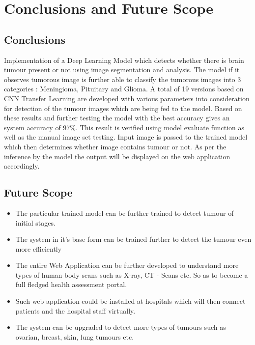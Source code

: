 \chapter{Conclusions and Future Scope}
\section{Conclusions }
Implementation of a Deep Learning Model which detects whether there is brain tumour present or not using image segmentation and analysis. The model if it observes tumorous image is further able to classify the tumorous images into 3 categories : Meningioma, Pituitary and Glioma. A total of 19 versions based on CNN Transfer Learning are developed with various parameters into consideration for detection of the tumour images which are being fed to the model. Based on these results and further testing the model with the best accuracy gives an system accuracy of 97\%. This result is verified using model evaluate function as well as the manual image set testing. Input image is passed to the trained model which then determines whether image contains tumour or not. As per the inference by the model the output will be displayed on the web application accordingly.
\section{Future Scope }
\begin{itemize}
    \item The particular trained model can be further trained to detect tumour of initial stages.
    \item The system in it’s base form can be trained further to detect the tumour even more efficiently
    \item The entire Web Application can be further developed to understand more types of human body scans such as X-ray, CT - Scans etc. So as to become a full fledged health assessment portal.
    \item Such web application could be installed at hospitals which will then connect patients and the hospital staff virtually.
    \item The system can be upgraded to detect more types of tumours such as ovarian, breast, skin, lung tumours etc.
    
\end{itemize}
